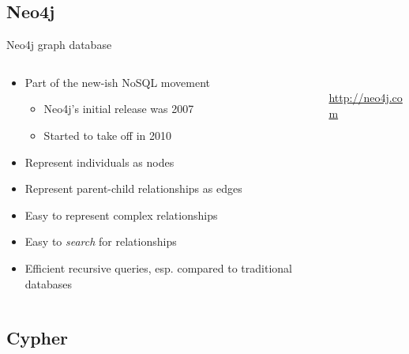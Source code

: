 \documentclass{beamer}
\newcommand{\linespace}{\vskip 0.25cm}
\begin{document}
\subsection{Neo4j}

\begin{frame}{Neo4j graph database}
	
\begin{columns} 
\begin{column}{0.65 \textwidth}
		\begin{itemize}
			\item Part of the new-ish NoSQL movement
			\begin{itemize}
				\item Neo4j's initial release was 2007
				\item Started to take off in 2010
			\end{itemize}
			\linespace
			\item Represent individuals as nodes
			\item Represent parent-child relationships as edges
			\linespace
			\item Easy to represent complex relationships
			\item Easy to \emph{search} for relationships
			\item Efficient recursive queries, esp. compared to traditional databases
		\end{itemize}
		\end{column}
		\begin{column}{0.35\textwidth}
			\centering
       \\
    \tiny{\url{http://neo4j.com}}
  \end{column}
  \end{columns}

\end{frame}

\subsection{Cypher}
\end{document}
